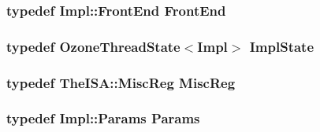 \label{classOzoneCPU_aab5eeae86499f9bfe15ef79360eccc64}
\hypertarget{classOzoneCPU_abe8e1d8243582d5024a1076f6091d9fe}{
\subsubsection[{FrontEnd}]{\setlength{\rightskip}{0pt plus 5cm}typedef Impl::FrontEnd {\bf FrontEnd}}}
\label{classOzoneCPU_abe8e1d8243582d5024a1076f6091d9fe}
\hypertarget{classOzoneCPU_ad0869a9831e79c51005b1444fa0a9127}{
\subsubsection[{ImplState}]{\setlength{\rightskip}{0pt plus 5cm}typedef {\bf OzoneThreadState}$<$Impl$>$ {\bf ImplState}}}
\label{classOzoneCPU_ad0869a9831e79c51005b1444fa0a9127}
\hypertarget{classOzoneCPU_aaf5f073a387db0556d1db4bcc45428bc}{
\subsubsection[{MiscReg}]{\setlength{\rightskip}{0pt plus 5cm}typedef TheISA::MiscReg {\bf MiscReg}}}
\label{classOzoneCPU_aaf5f073a387db0556d1db4bcc45428bc}
\hypertarget{classOzoneCPU_a818e103eae798a24a06a0a34631849ea}{
\subsubsection[{Params}]{\setlength{\rightskip}{0pt plus 5cm}typedef Impl::Params {\bf Params}}}
\label{classOzoneCPU_a818e103eae798a24a06a0a34631849ea}


